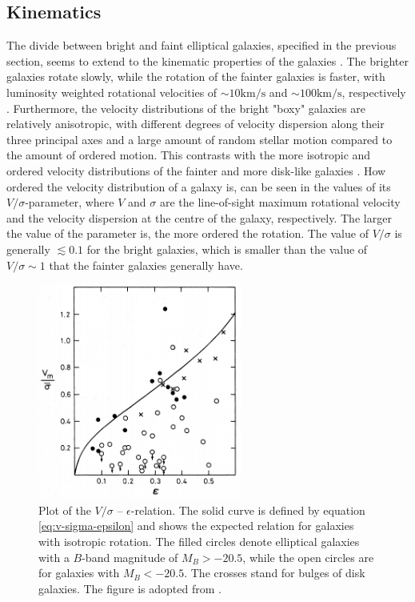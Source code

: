 \documentclass[english, twoside]{HYgradu}
\begin{document}
\subsection{Kinematics} \label{section:ellip_kinematics}

The divide between bright and faint elliptical galaxies, specified in the previous section, seems to extend to the kinematic properties of the galaxies \citep[discussed in e.g.][]{GalaxyFormationAndEvo2010}. The brighter galaxies rotate slowly, while the rotation of the fainter galaxies is faster, with luminosity weighted rotational velocities of $\sim 10 \mathrm{km/s}$ and $\sim 100 \mathrm{km/s}$, respectively \citep{Davies1983, Cappellari2007}. Furthermore, the velocity distributions of the bright "boxy" galaxies are relatively anisotropic, with different degrees of velocity dispersion along their three principal axes and a large amount of random stellar motion compared to the amount of ordered motion. This contrasts with the more isotropic and ordered velocity distributions of the fainter and more disk-like galaxies \citep{Kormendy2009, Krajnovic2008}. How ordered the velocity distribution of a galaxy is, can be seen in the values of its $V/\sigma$-parameter, where $V$ and $\sigma$ are the line-of-sight maximum rotational velocity and the velocity dispersion at the centre of the galaxy, respectively. The larger the value of the parameter is, the more ordered the rotation. The value of $V/\sigma$ is generally $\lesssim 0.1$ for the bright galaxies, which is smaller than the value of $V/\sigma \sim 1$ that the fainter galaxies generally have.

\begin{figure}
	\centering
	\includegraphics[width=0.60\textwidth]{davies_v-sigma.png}
	\caption{Plot of the $V/\sigma$ – $\epsilon$-relation. The solid curve is defined by equation \ref{eq:v-sigma-epsilon} and shows the expected relation for galaxies with isotropic rotation. The filled circles denote elliptical galaxies with a $B$-band magnitude of $M_B > -20.5$, while the open circles are for galaxies with $M_B < -20.5$. The crosses stand for bulges of disk galaxies. The figure is adopted from \cite{Davies1983}.}
	\label{figure:v-sigma}
\end{figure}
\end{document}
